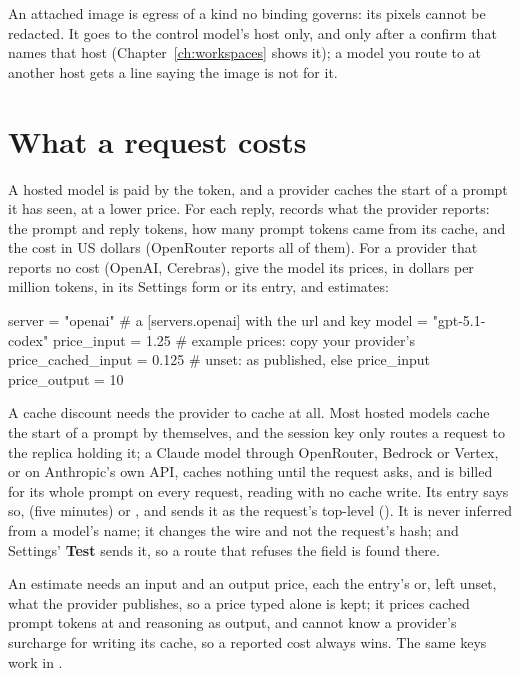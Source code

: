 An attached image is egress of a kind no binding governs: its pixels cannot
be redacted. It goes to the control model's host only, and only after a
confirm that names that host (Chapter~\ref{ch:workspaces} shows it); a
model you route to at another host gets a line saying the image is not for
it.

\section{What a request costs}

A hosted model is paid by the token, and a provider caches the start of a
prompt it has seen, at a lower price. For each reply, \nodwyn{} records
what the provider reports: the prompt and reply tokens, how many prompt
tokens came from its cache, and the cost in US dollars (OpenRouter reports
all of them).
For a provider that reports no cost (OpenAI, Cerebras), give the model its
prices, in dollars per million tokens, in its Settings form or its entry, and
\nodwyn{} estimates:

\begin{toml}
server = "openai"               # a [servers.openai] with the url and key
model = "gpt-5.1-codex"
price_input = 1.25              # example prices: copy your provider's
price_cached_input = 0.125      # unset: as published, else price_input
price_output = 10
\end{toml}

A cache discount needs the provider to cache at all. Most hosted models cache
the start of a prompt by themselves, and the session key only routes a request
to the replica holding it; a Claude model through OpenRouter, Bedrock or
Vertex, or on Anthropic's own API, caches nothing until the request asks, and is billed for its whole prompt
on every request, reading  with no cache write. Its
entry says so,  (five minutes) or
, and \nodwyn{} sends it as the request's top-level
 (). It is never inferred from a model's name; it
changes the wire and not the request's hash; and Settings'
\textbf{Test} sends it, so a route that refuses the field is found there.

An estimate needs an input and an output price, each the entry's or, left
unset, what the provider publishes, so a price typed alone is kept; it
prices cached prompt tokens at  and reasoning as
output, and cannot know a provider's surcharge for writing its cache, so a
reported cost always wins. The same keys work in \code{[control]}.

